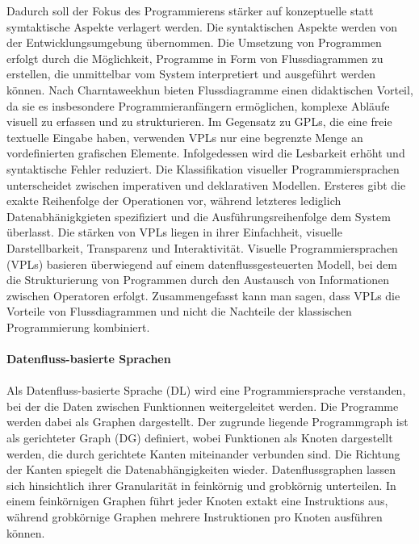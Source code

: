 \documentclass{article}
\begin{document}
    Dadurch soll der Fokus des Programmierens stärker auf konzeptuelle statt symtaktische Aspekte verlagert werden. Die syntaktischen Aspekte werden von der Entwicklungsumgebung übernommen. \cite{10}
    Die Umsetzung von Programmen erfolgt durch die Möglichkeit, Programme in Form von Flussdiagrammen zu erstellen, die unmittelbar vom System interpretiert und ausgeführt werden können. \cite{12}
    Nach Charntaweekhun bieten Flussdiagramme einen didaktischen Vorteil, da sie es insbesondere Programmieranfängern ermöglichen, komplexe Abläufe visuell zu erfassen und zu strukturieren. \cite{12}
    Im Gegensatz zu GPLs, die eine freie textuelle Eingabe haben, verwenden VPLs nur eine begrenzte Menge an vordefinierten grafischen Elemente. Infolgedessen wird die Lesbarkeit erhöht und syntaktische Fehler reduziert.\cite{10}
    Die Klassifikation visueller Programmiersprachen unterscheidet zwischen imperativen und deklarativen Modellen. Ersteres gibt die exakte Reihenfolge der Operationen vor, während letzteres lediglich Datenabhänigkgieten spezifiziert und die Ausführungsreihenfolge dem System überlasst.\cite{21}
    Die stärken von VPLs liegen in ihrer Einfachheit, visuelle Darstellbarkeit, Transparenz und Interaktivität.\cite{13}
    Visuelle Programmiersprachen (VPLs) basieren überwiegend auf einem datenflussgesteuerten Modell, bei dem die Strukturierung von Programmen durch den Austausch von Informationen zwischen Operatoren erfolgt. \cite{6}
    Zusammengefasst kann man sagen, dass VPLs die Vorteile von Flussdiagrammen und nicht die Nachteile der klassischen Programmierung kombiniert. \cite{13}\\
    \\
    \textbf{Datenfluss-basierte Sprachen}\\
    \\
    Als Datenfluss-basierte Sprache (DL) wird eine Programmiersprache verstanden, bei der die Daten zwischen Funktionnen weitergeleitet werden. Die Programme werden dabei als Graphen dargestellt. \cite{11}
    Der zugrunde liegende Programmgraph ist als gerichteter Graph (DG) definiert, wobei Funktionen als Knoten dargestellt werden, die durch gerichtete Kanten miteinander verbunden sind. Die Richtung der Kanten spiegelt die Datenabhängigkeiten wieder.\cite{2}
    Datenflussgraphen lassen sich hinsichtlich ihrer Granularität in feinkörnig und grobkörnig unterteilen. In einem feinkörnigen Graphen führt jeder Knoten extakt eine Instruktions aus, während grobkörnige Graphen mehrere Instruktionen pro Knoten ausführen können.\cite{1}
\end{document}

